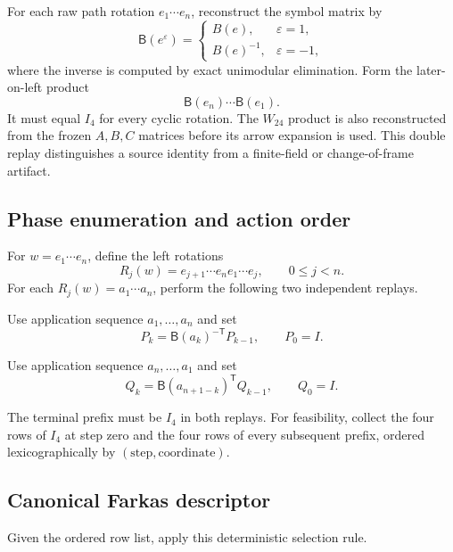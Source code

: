 For each raw path rotation $e_1\cdots e_n$, reconstruct the symbol matrix by
\[
 \mathsf B(e^\varepsilon)=
 \begin{cases}
 B(e),&\varepsilon=1,\\
 B(e)^{-1},&\varepsilon=-1,
 \end{cases}
\]
where the inverse is computed by exact unimodular elimination.  Form the
later-on-left product
\[
 \mathsf B(e_n)\cdots\mathsf B(e_1).
\]
It must equal $I_4$ for every cyclic rotation.  The $W_{24}$ product is also
reconstructed from the frozen $A,B,C$ matrices before its arrow expansion is
used.  This double replay distinguishes a source identity from a finite-field
or change-of-frame artifact.

\subsection{Phase enumeration and action order}

For $w=e_1\cdots e_n$, define the left rotations
\[
 R_j(w)=e_{j+1}\cdots e_ne_1\cdots e_j,
 \qquad 0\leq j<n.
\]
For each $R_j(w)=a_1\cdots a_n$, perform the following two independent
replays.

\begin{description}[style=nextline,leftmargin=2.9cm]
\item[Length replay.]
Use application sequence $a_1,\dots,a_n$ and set
\[
 P_k=\mathsf B(a_k)^{-\mathsf T}P_{k-1},\qquad P_0=I.
\]

\item[Transfer replay.]
Use application sequence $a_n,\dots,a_1$ and set
\[
 Q_k=\mathsf B(a_{n+1-k})^{\mathsf T}Q_{k-1},\qquad Q_0=I.
\]
\end{description}

The terminal prefix must be $I_4$ in both replays.  For feasibility, collect
the four rows of $I_4$ at step zero and the four rows of every subsequent
prefix, ordered lexicographically by
$(\mathrm{step},\mathrm{coordinate})$.

\subsection{Canonical Farkas descriptor}

Given the ordered row list, apply this deterministic selection rule.

